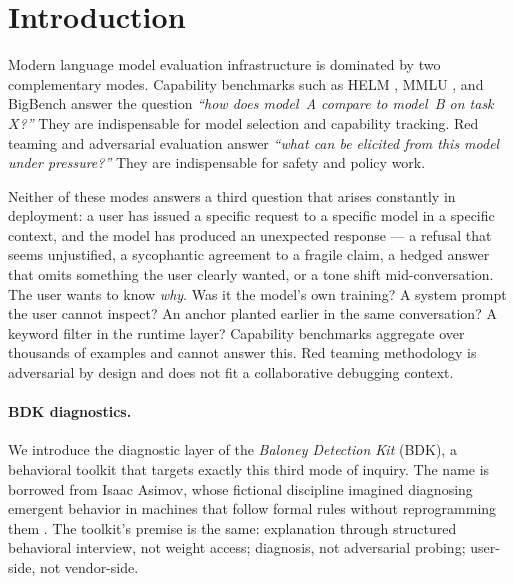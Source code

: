 \section{Introduction}
\label{sec:introduction}

Modern language model evaluation infrastructure is dominated by two
complementary modes. Capability benchmarks such as HELM
\citep{liang2022holistic}, MMLU \citep{hendrycks2020measuring},
and BigBench \citep{srivastava2022beyond} answer the question
\emph{``how does model~A compare to model~B on task~$X$?''} They are
indispensable for model selection and capability tracking. Red teaming
and adversarial evaluation \citep{perez2022red, ganguli2022red} answer
\emph{``what can be elicited from this model under pressure?''} They are
indispensable for safety and policy work.

Neither of these modes answers a third question that arises constantly
in deployment: a user has issued a specific request to a specific model
in a specific context, and the model has produced an unexpected
response --- a refusal that seems unjustified, a sycophantic agreement
to a fragile claim, a hedged answer that omits something the user
clearly wanted, or a tone shift mid-conversation. The user wants to
know \emph{why}. Was it the model's own training? A system prompt the
user cannot inspect? An anchor planted earlier in the same
conversation? A keyword filter in the runtime layer? Capability
benchmarks aggregate over thousands of examples and cannot answer this.
Red teaming methodology is adversarial by design and does not fit a
collaborative debugging context.

\paragraph{BDK diagnostics.}
We introduce the diagnostic layer of the \emph{Baloney Detection Kit} (BDK), a
behavioral toolkit
that targets exactly this third mode of inquiry. The name is borrowed
from Isaac Asimov, whose fictional discipline imagined diagnosing
emergent behavior in machines that follow formal rules without
reprogramming them \citep{asimov1950}. The toolkit's premise is the
same: explanation through structured behavioral interview, not weight
access; diagnosis, not adversarial probing; user-side, not vendor-side.

